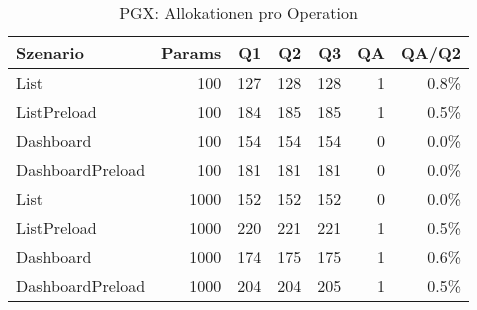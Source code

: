 \begin{table}[ht]
\centering
\caption{PGX: Allokationen pro Operation}
\begin{tabular}{lrrrrrr}
\toprule
Szenario & Params & Q1 & Q2 & Q3 & QA & QA/Q2 \\
\midrule
		List & 100 & 127 & 128 & 128 & 1 & 0.8\% \\
		ListPreload & 100 & 184 & 185 & 185 & 1 & 0.5\% \\
		Dashboard & 100 & 154 & 154 & 154 & 0 & 0.0\% \\
		DashboardPreload & 100 & 181 & 181 & 181 & 0 & 0.0\% \\
		List & 1000 & 152 & 152 & 152 & 0 & 0.0\% \\
		ListPreload & 1000 & 220 & 221 & 221 & 1 & 0.5\% \\
		Dashboard & 1000 & 174 & 175 & 175 & 1 & 0.6\% \\
		DashboardPreload & 1000 & 204 & 204 & 205 & 1 & 0.5\% \\
\bottomrule
\end{tabular}
\label{tab:benchmark_pgx_allocsperop}
\end{table}
	